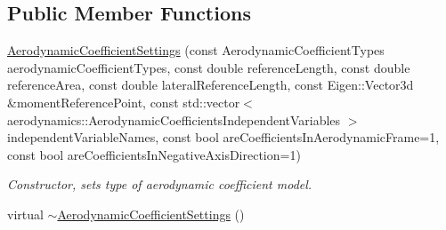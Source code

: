 \subsection*{Public Member Functions}
\begin{DoxyCompactItemize}
\item 
\hyperlink{classtudat_1_1simulation__setup_1_1AerodynamicCoefficientSettings_aa7965f3d180b9fbc3fdefa8b399473e8}{Aerodynamic\+Coefficient\+Settings} (const Aerodynamic\+Coefficient\+Types aerodynamic\+Coefficient\+Types, const double reference\+Length, const double reference\+Area, const double lateral\+Reference\+Length, const Eigen\+::\+Vector3d \&moment\+Reference\+Point, const std\+::vector$<$ aerodynamics\+::\+Aerodynamic\+Coefficients\+Independent\+Variables $>$ independent\+Variable\+Names, const bool are\+Coefficients\+In\+Aerodynamic\+Frame=1, const bool are\+Coefficients\+In\+Negative\+Axis\+Direction=1)
\begin{DoxyCompactList}\small\item\em Constructor, sets type of aerodynamic coefficient model. \end{DoxyCompactList}\item 
virtual \hyperlink{classtudat_1_1simulation__setup_1_1AerodynamicCoefficientSettings_a2286359e82a186bbfa640447859dffcb}{$\sim$\+Aerodynamic\+Coefficient\+Settings} ()\hypertarget{classtudat_1_1simulation__setup_1_1AerodynamicCoefficientSettings_a2286359e82a186bbfa640447859dffcb}{}\label{classtudat_1_1simulation__setup_1_1AerodynamicCoefficientSettings_a2286359e82a186bbfa640447859dffcb}


\end{DoxyCompactItemize}
